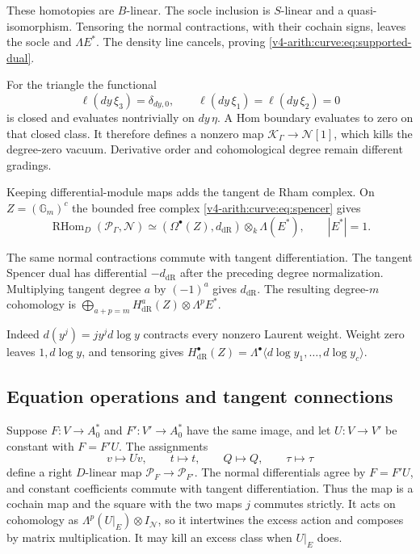 These homotopies are $B$-linear. The socle inclusion is
$S$-linear and a quasi-isomorphism. Tensoring the normal
contractions, with their cochain signs, leaves the socle and
$\Lambda E^*$. The density line cancels, proving
\eqref{v4-arith:curve:eq:supported-dual}.

For the triangle the functional
\[
 \ell(dy\,\xi_3)=\delta_{dy,0},\qquad
 \ell(dy\,\xi_1)=\ell(dy\,\xi_2)=0
\]
is closed and evaluates nontrivially on $dy\,\eta$.
A Hom boundary evaluates to zero on that closed class.
It therefore defines a nonzero map
$\mathcal K_\Gamma\to\mathcal N[1]$, which kills the
degree-zero vacuum. Derivative order and cohomological degree
remain different gradings.

Keeping differential-module maps adds the tangent de Rham
complex. On $Z=(\mathbb G_m)^c$ the bounded free complex
\eqref{v4-arith:curve:eq:spencer} gives
\[
 \operatorname{RHom}_D(\mathcal P_\Gamma,\mathcal N)
 \simeq(\Omega^\bullet(Z),d_{\mathrm{dR}})\otimes_k\Lambda(E^*),
 \qquad |E^*|=1.
\]

The same normal contractions commute with tangent
differentiation. The tangent Spencer dual has differential
$-d_{\mathrm{dR}}$ after the preceding degree normalization.
Multiplying tangent degree $a$ by $(-1)^a$ gives $d_{\mathrm{dR}}$.
The resulting degree-$m$ cohomology is
$\bigoplus_{a+p=m}H^a_{\mathrm{dR}}(Z)\otimes\Lambda^pE^*$.

Indeed $d(y^j)=j y^j d\log y$ contracts every nonzero Laurent
weight. Weight zero leaves $1,d\log y$, and tensoring gives
$H^\bullet_{\mathrm{dR}}(Z)=\Lambda^\bullet\langle d\log y_1,\ldots,d\log y_c\rangle$.

\subsection{Equation operations and tangent connections}

Suppose $F:V\to A_0^*$ and $F':V'\to A_0^*$ have the same image,
and let $U:V\to V'$ be constant with $F=F'U$. The assignments
\[
 v\longmapsto Uv,\qquad t\longmapsto t,\qquad
 Q\longmapsto Q,\qquad \tau\longmapsto\tau
\]
define a right $D$-linear map $\mathcal P_F\to\mathcal P_{F'}$.
The normal differentials agree by $F=F'U$, and constant
coefficients commute with tangent differentiation. Thus the map
is a cochain map and the square with the two maps $j$ commutes
strictly. It acts on cohomology as
$\Lambda^p(U|_E)\otimes I_{\mathcal N}$, so it intertwines the
excess action and composes by matrix multiplication.
It may kill an excess class when $U|_E$ does.


